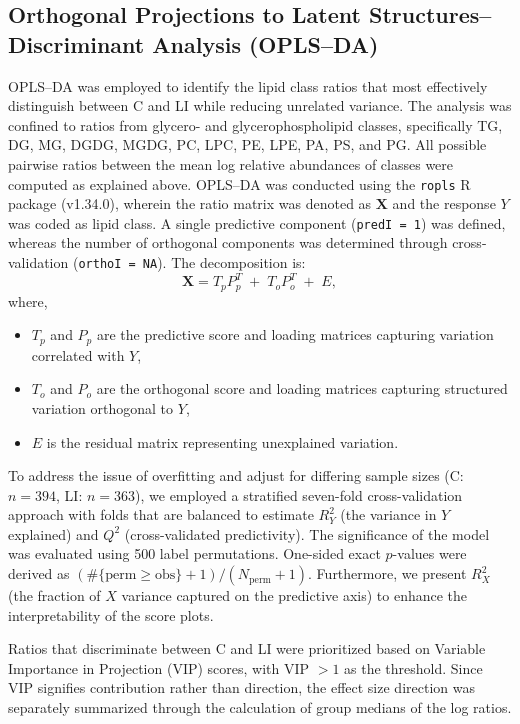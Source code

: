 \documentclass[10pt,letterpaper]{article}
\begin{document}
\begin{itemize}
\subsection*{Orthogonal Projections to Latent Structures–Discriminant Analysis (OPLS–DA)}

OPLS–DA was employed to identify the lipid class ratios that most effectively distinguish between C and LI while reducing unrelated variance. The analysis was confined to ratios from glycero- and glycerophospholipid classes, specifically TG, DG, MG, DGDG, MGDG, PC, LPC, PE, LPE, PA, PS, and PG. All possible pairwise ratios between the mean log relative abundances of classes were computed as explained above. OPLS–DA was conducted using the \texttt{ropls} R package (v1.34.0), wherein the ratio matrix was denoted as $\mathbf{X}$ and the response $Y$ was coded as lipid class. A single predictive component (\texttt{predI = 1}) was defined, whereas the number of orthogonal components was determined through cross-validation (\texttt{orthoI = NA}). The decomposition is:
\[
  \mathbf{X} = T_{p} P_{p}^{T} \;+\; T_{o} P_{o}^{T} \;+\; E,
\]
where,
\begin{itemize}
  \item \(T_{p}\) and \(P_{p}\) are the predictive score and loading matrices capturing variation correlated with \(Y\),
  \item \(T_{o}\) and \(P_{o}\) are the orthogonal score and loading matrices capturing structured variation orthogonal to \(Y\),
  \item \(E\) is the residual matrix representing unexplained variation.
\end{itemize}

To address the issue of overfitting and adjust for differing sample sizes (C: $n=394$, LI: $n=363$), we employed a stratified seven-fold cross-validation approach with folds that are balanced to estimate $R^{2}_{Y}$ (the variance in $Y$ explained) and $Q^{2}$ (cross-validated predictivity). The significance of the model was evaluated using 500 label permutations. One-sided exact $p$-values were derived as $(\#\{\text{perm} \geq \text{obs}\} + 1)/(N_{\text{perm}} + 1)$. Furthermore, we present $R^{2}_{X}$ (the fraction of $X$ variance captured on the predictive axis) to enhance the interpretability of the score plots.

Ratios that discriminate between C and LI were prioritized based on Variable Importance in Projection (VIP) scores, with VIP $> 1$ as the threshold. Since VIP signifies contribution rather than direction, the effect size direction was separately summarized through the calculation of group medians of the log ratios. 


\end{itemize}
\end{document}
